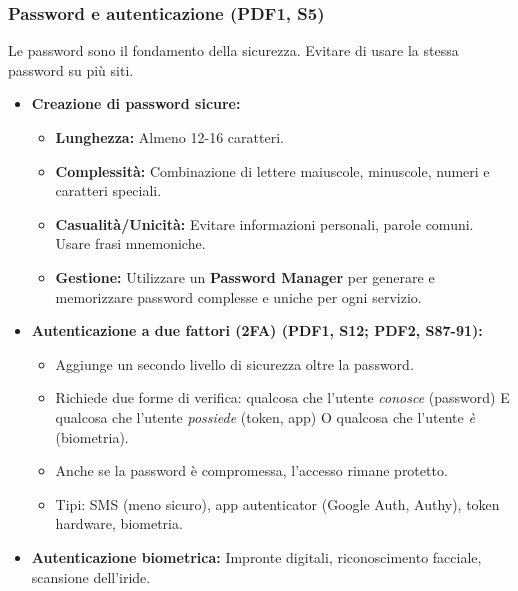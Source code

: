 \documentclass{beamer}
\begin{document}
\begin{frame}
  \frametitle{Password e autenticazione (PDF1, S5)}
  Le password sono il fondamento della sicurezza. Evitare di usare la stessa password su più siti.
  \begin{itemize}
    \item \textbf{Creazione di password sicure:}
    \begin{itemize}
        \item \textbf{Lunghezza:} Almeno 12-16 caratteri.
        \item \textbf{Complessità:} Combinazione di lettere maiuscole, minuscole, numeri e caratteri speciali.
        \item \textbf{Casualità/Unicità:} Evitare informazioni personali, parole comuni. Usare frasi mnemoniche.
        \item \textbf{Gestione:} Utilizzare un \textbf{Password Manager} per generare e memorizzare password complesse e uniche per ogni servizio.
    \end{itemize}
    \item \textbf{Autenticazione a due fattori (2FA) (PDF1, S12; PDF2, S87-91):}
    \begin{itemize}
        \item Aggiunge un secondo livello di sicurezza oltre la password.
        \item Richiede due forme di verifica: qualcosa che l'utente \textit{conosce} (password) E qualcosa che l'utente \textit{possiede} (token, app) O qualcosa che l'utente \textit{è} (biometria).
        \item Anche se la password è compromessa, l'accesso rimane protetto.
        \item Tipi: SMS (meno sicuro), app autenticator (Google Auth, Authy), token hardware, biometria.
    \end{itemize}
    \item \textbf{Autenticazione biometrica:} Impronte digitali, riconoscimento facciale, scansione dell'iride.
  \end{itemize}
\end{frame}
\end{document}
